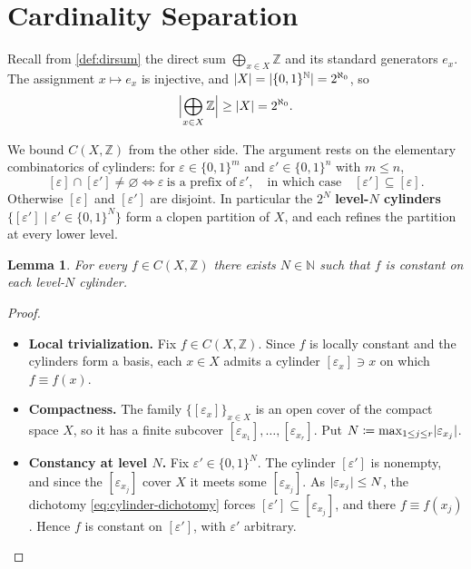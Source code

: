 \documentclass{extracta-temp-26}
\makeatletter
\numberwithin{equation}{section}
\newtheorem{lem}[teo]{Lemma}
\theoremstyle{definition}
\theoremstyle{remark}
\newcommand{\Z}{\mathbb{Z}}
\newcommand{\N}{\mathbb{N}}
\DeclarePairedDelimiter{\abs}{\lvert}{\rvert}
\newcommand{\term}[1]{\textbf{#1}}
\newcommand{\step}[1]{\textbf{#1}}
\newcommand{\keepwithnext}{\leavevmode\par\nobreak\@afterheading}
\makeatother
\begin{document}
\section{Cardinality Separation}\label{sec:cardinality}
Recall from \cref{def:dirsum} the direct sum \(\bigoplus_{x\in X}\Z\) and its standard generators \(e_x\).
The assignment \(x\mapsto e_x\) is injective, and \(\abs{X}=\abs{\{0,1\}^{\N}}=2^{\aleph_0}\), so
\begin{equation}\label{eq:card-lower}
\abs[\Big]{\bigoplus_{x\in X}\Z}\ge\abs{X}=2^{\aleph_0}.
\end{equation}

We bound \(C(X,\Z)\) from the other side.
The argument rests on the elementary combinatorics of cylinders: for \(\varepsilon\in\{0,1\}^m\) and \(\varepsilon'\in\{0,1\}^n\) with \(m\le n\),
\begin{equation}\label{eq:cylinder-dichotomy}
[\varepsilon]\cap[\varepsilon']\neq\varnothing
\iff
\varepsilon\ \text{is a prefix of}\ \varepsilon',
\quad\text{in which case}\quad
[\varepsilon']\subseteq[\varepsilon].
\end{equation}
Otherwise \([\varepsilon]\) and \([\varepsilon']\) are disjoint.
In particular the \(2^N\) \term{level-\(N\) cylinders} \(\{[\varepsilon']\mid\varepsilon'\in\{0,1\}^N\}\) form a clopen partition of \(X\), and each refines the partition at every lower level.

\begin{lem}\label{lem:resolution}
For every \(f\in C(X,\Z)\) there exists \(N\in\N\) such that \(f\) is constant on each level-\(N\) cylinder.
\end{lem}

\begin{proof}\keepwithnext
\begin{itemize}
\item \step{Local trivialization.}
Fix \(f\in C(X,\Z)\).
Since \(f\) is locally constant and the cylinders form a basis, each \(x\in X\) admits a cylinder \([\varepsilon_x]\ni x\) on which \(f\equiv f(x)\).
\item \step{Compactness.}
The family \(\{[\varepsilon_x]\}_{x\in X}\) is an open cover of the compact space \(X\), so it has a finite subcover \([\varepsilon_{x_1}],\dots,[\varepsilon_{x_r}]\).
Put \(N\coloneqq\max_{1\le j\le r}\abs{\varepsilon_{x_j}}\).
\item \step{Constancy at level \(N\).}
Fix \(\varepsilon'\in\{0,1\}^N\).
The cylinder \([\varepsilon']\) is nonempty, and since the \([\varepsilon_{x_j}]\) cover \(X\) it meets some \([\varepsilon_{x_j}]\).
As \(\abs{\varepsilon_{x_j}}\le N\), the dichotomy \eqref{eq:cylinder-dichotomy} forces \([\varepsilon']\subseteq[\varepsilon_{x_j}]\), and there \(f\equiv f(x_j)\).
Hence \(f\) is constant on \([\varepsilon']\), with \(\varepsilon'\) arbitrary.\qedhere
\end{itemize}
\end{proof}
\end{document}
